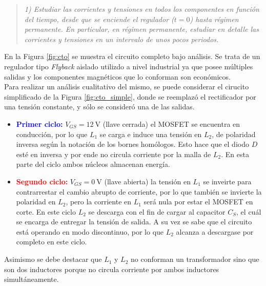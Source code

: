 \begin{quote} \textit{1) Estudiar las corrientes y tensiones en todos los componentes en función del tiempo, desde que se enciende el regulador ($t=0$) hasta régimen permanente. En particular, en régimen permanente, estudiar en detalle las corrientes y tensiones en un intervalo de unos pocos periodos.}
\end{quote}


En la Figura \ref{fig:cto} se muestra el circuito completo bajo análisis. Se trata de un regulador tipo \textit{Flyback} aislado utilizdo a nivel industrial ya que posee múltiples salidas y los componentes magnéticos que lo conforman son económicos.\\
\indent Para realizar un análisis cualitativo del mismo, se puede considerar el cirucito simplificado de la Figura \ref{fig:cto_simple}, donde se reemplazó el rectificador por una tensión constante, y sólo se consideró una de las salidas.


\begin{itemize}
	\item \textcolor{blue}{\textbf{Primer ciclo:}} $V_{GS}=\SI{12}{\volt}$ (llave cerrada) el MOSFET se encuentra en conducción, por lo que $L_1$ se carga e induce una tensión en $L_2$, de polaridad inversa según la notación de los bornes homólogos. Esto hace que el diodo $D$ esté en inversa y por ende no circula corriente por la malla de $L_2$. En esta parte del ciclo ambos núcleos almacenan energía.

	\item \textcolor{red}{\textbf{Segundo ciclo:}} $V_{GS} = \SI{0}{\volt}$ (llave abierta) la tensión en $L_1$ se inveirte para contrarrestar el cambio abrupto de corriente, por lo que también se invierte la polaridad en $L_2$, pero la corriente en $L_1$ será nula por estar el MOSFET en corte.
		En este ciclo $L_2$ se descarga con el fin de cargar al capacitor $C_S$, el cuál se encarga de entregar la tensión de salida. A su vez se sabe que el circuito está operando en modo discontinuo, por lo que $L_2$ alcanza a descargase por completo en este ciclo.
\end{itemize}


	Asimismo se debe destacar que $L_1$ y $L_2$ no conforman un transformador sino que son dos inductores porque no circula corriente por ambos inductores simultáneamente.

